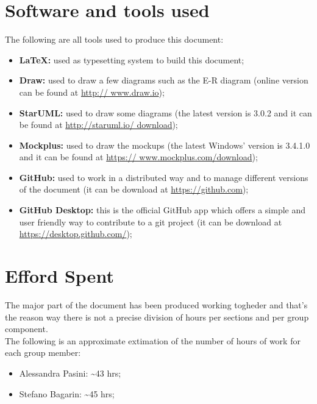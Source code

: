 \section{Software and tools used}
The following are all tools used to produce this document:
\begin{itemize}
	\item \textbf{\LaTeX:} used as typesetting system to build this document;
	\item \textbf{Draw:} used to draw a few diagrams such as the E-R diagram (online version can be found at \url{http://				www.draw.io});
	\item \textbf{StarUML:} used to draw some diagrams (the latest version is 3.0.2 and it can be found at \url{http://staruml.io/			download});
	\item \textbf{Mockplus:} used to draw the mockups (the latest Windows' version is 3.4.1.0 and it can be found at \url{https://			www.mockplus.com/download});
	\item \textbf{GitHub:} used to work in a distributed way and to manage different versions of the document (it can be download at		\url{https://github.com});
	\item \textbf{GitHub Desktop:} this is the official GitHub app which offers a simple and user friendly way to contribute to a git 			project (it can be download at \url{https://desktop.github.com/});
\end{itemize}

\section{Efford Spent}
The major part of the document has been produced working togheder and that's the reason way there is not a precise division of hours per sections and per group component.\\
The following is an approximate extimation of the number of hours of work for each group member:
\begin{itemize}
\item Alessandra Pasini: \textasciitilde 43 hrs;
\item Stefano Bagarin: \textasciitilde 45 hrs;
\end{itemize}

